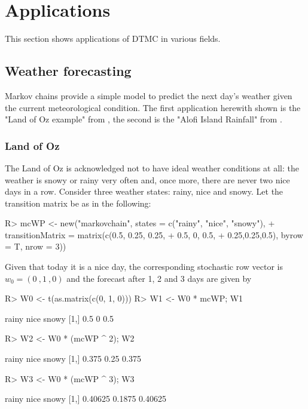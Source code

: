 \documentclass[nojss]{jss}
\begin{document}
\section{Applications}\label{sec:applications}

This section shows applications of DTMC in various
fields.

\subsection{Weather forecasting}\label{app:weather}

Markov chains provide a simple model to predict the next day's weather given the
current meteorological condition.
The first application herewith shown is the "Land of Oz example" from \cite{landOfOz}, the second is the "Alofi Island Rainfall" from \cite{averyHenderson}.

\subsubsection{Land of Oz}\label{sec:wfLandOfOz}

The Land of Oz is 
acknowledged not to have ideal weather conditions at all: 
the weather is snowy or rainy very often and, once more, there are never two
nice days in a row. Consider three weather states: rainy, nice and snowy. Let the transition matrix be as in the following:

\begin{Schunk}
\begin{Sinput}
R> mcWP <- new("markovchain", states = c("rainy", "nice", "snowy"),
+           transitionMatrix = matrix(c(0.5, 0.25, 0.25,
+                                     0.5, 0, 0.5,
+                                     0.25,0.25,0.5), byrow = T, nrow = 3))
\end{Sinput}
\end{Schunk}

Given that today it is a nice day, the corresponding stochastic row vector is
$w_{0}=(0\:,1\:,0)$ and the forecast after 1, 2 and 3 days are given by

\begin{Schunk}
\begin{Sinput}
R> W0 <- t(as.matrix(c(0, 1, 0)))
R> W1 <- W0 * mcWP; W1
\end{Sinput}
\begin{Soutput}
     rainy nice snowy
[1,]   0.5    0   0.5
\end{Soutput}
\begin{Sinput}
R> W2 <- W0 * (mcWP ^ 2); W2
\end{Sinput}
\begin{Soutput}
     rainy nice snowy
[1,] 0.375 0.25 0.375
\end{Soutput}
\begin{Sinput}
R> W3 <- W0 * (mcWP ^ 3); W3
\end{Sinput}
\begin{Soutput}
       rainy   nice   snowy
[1,] 0.40625 0.1875 0.40625
\end{Soutput}
\end{Schunk}
\end{document}

